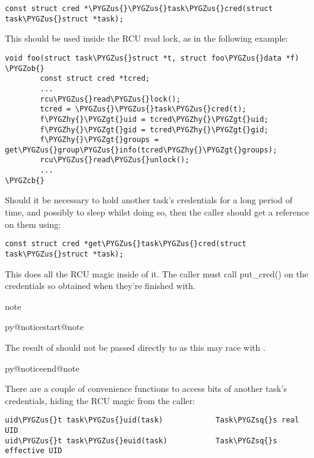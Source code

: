 \documentclass[a4paper,8pt,english]{sphinxmanual}
\makeatletter
\renewenvironment{notice}[2]{%
          \def\py@noticetype{#1}
          \begin{coloredbox}{#1}
          \bf\it
          \par\strong{#2}
          \csname py@noticestart@#1\endcsname
        }
	{
          \csname py@noticeend@\py@noticetype\endcsname
          \end{coloredbox}
        }
\def\PYGZus{\char`\_}
\def\PYGZob{\char`\{}
\def\PYGZcb{\char`\}}
\def\PYGZgt{\char`\>}
\def\PYGZhy{\char`\-}
\def\PYGZsq{\char`\'}
\renewcommand\PYGZsq{\textquotesingle}
\makeatother
\begin{document}
\begin{Verbatim}[commandchars=\\\{\}]
const struct cred *\PYGZus{}\PYGZus{}task\PYGZus{}cred(struct task\PYGZus{}struct *task);
\end{Verbatim}

This should be used inside the RCU read lock, as in the following example:

\begin{Verbatim}[commandchars=\\\{\}]
void foo(struct task\PYGZus{}struct *t, struct foo\PYGZus{}data *f)
\PYGZob{}
        const struct cred *tcred;
        ...
        rcu\PYGZus{}read\PYGZus{}lock();
        tcred = \PYGZus{}\PYGZus{}task\PYGZus{}cred(t);
        f\PYGZhy{}\PYGZgt{}uid = tcred\PYGZhy{}\PYGZgt{}uid;
        f\PYGZhy{}\PYGZgt{}gid = tcred\PYGZhy{}\PYGZgt{}gid;
        f\PYGZhy{}\PYGZgt{}groups = get\PYGZus{}group\PYGZus{}info(tcred\PYGZhy{}\PYGZgt{}groups);
        rcu\PYGZus{}read\PYGZus{}unlock();
        ...
\PYGZcb{}
\end{Verbatim}

Should it be necessary to hold another task's credentials for a long period of
time, and possibly to sleep whilst doing so, then the caller should get a
reference on them using:

\begin{Verbatim}[commandchars=\\\{\}]
const struct cred *get\PYGZus{}task\PYGZus{}cred(struct task\PYGZus{}struct *task);
\end{Verbatim}

This does all the RCU magic inside of it.  The caller must call put\_cred() on
the credentials so obtained when they're finished with.

\begin{notice}{note}{Note:}
The result of  should not be passed directly to
 as this may race with .
\end{notice}

There are a couple of convenience functions to access bits of another task's
credentials, hiding the RCU magic from the caller:

\begin{Verbatim}[commandchars=\\\{\}]
uid\PYGZus{}t task\PYGZus{}uid(task)            Task\PYGZsq{}s real UID
uid\PYGZus{}t task\PYGZus{}euid(task)           Task\PYGZsq{}s effective UID
\end{Verbatim}
\end{document}
